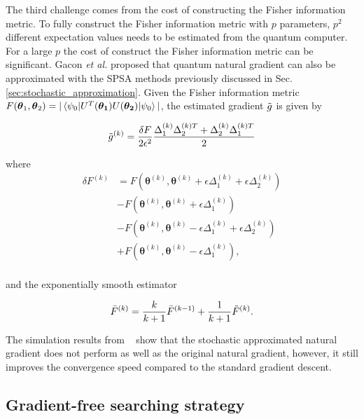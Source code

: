 The third challenge comes from the cost of constructing the Fisher information metric. To fully construct the Fisher information metric with $p$ parameters, $p^2$ different expectation values needs to be estimated from the quantum computer. For a large $p$ the cost of construct the Fisher information metric can be significant. Gacon \textit{et al.} \cite{Gacon2021simultaneous} proposed that quantum natural gradient can also be approximated with the SPSA methods previously discussed in Sec. \ref{sec:stochastic_approximation}. Given the Fisher information metric $F(\boldsymbol{\theta}_1,\boldsymbol{\theta}_2) = |\braket{\psi_0|U^T(\boldsymbol{\theta_1})U(\boldsymbol{\theta_2})|\psi_0}|$, the estimated gradient $\Tilde{g}$ is given by

\begin{equation}
    \Tilde{g}^{(k)} = \frac{\delta F}{2\epsilon^2}\frac{\Delta^{(k)}_1\Delta^{(k)T}_2+\Delta^{(k)}_2\Delta^{(k)T}_1}{2}
\end{equation}

where 
\begin{align}
    \delta F^{(k)} &= F(\boldsymbol{\theta}^{(k)},\boldsymbol{\theta}^{(k)}+\epsilon\Delta_1^{(k)} +\epsilon\Delta_2^{(k)}) \\ 
    &- F(\boldsymbol{\theta}^{(k)},\boldsymbol{\theta}^{(k)}+\epsilon\Delta_1^{(k)}) \\
    &- F(\boldsymbol{\theta}^{(k)},\boldsymbol{\theta}^{(k)}-\epsilon \Delta_1^{(k)} + \epsilon \Delta_2^{(k)}) \\ 
    &+ F(\boldsymbol{\theta}^{(k)},\boldsymbol{\theta}^{(k)}-\epsilon \Delta_1^{(k)}), \\ 
\end{align}

and the exponentially smooth estimator 
 
 \begin{equation}
 \bar{F}^{(k)} = \frac{k}{k+1} \bar{F}^{(k-1)} + \frac{1}{k+1} \Tilde{F}^{(k)}.
 \end{equation}

The simulation results from ~\cite{Gacon2021simultaneous} show that the stochastic approximated natural gradient does not perform as well as the original natural gradient, however, it still improves the convergence speed compared to the standard gradient descent.   

\subsection{Gradient-free searching strategy}

